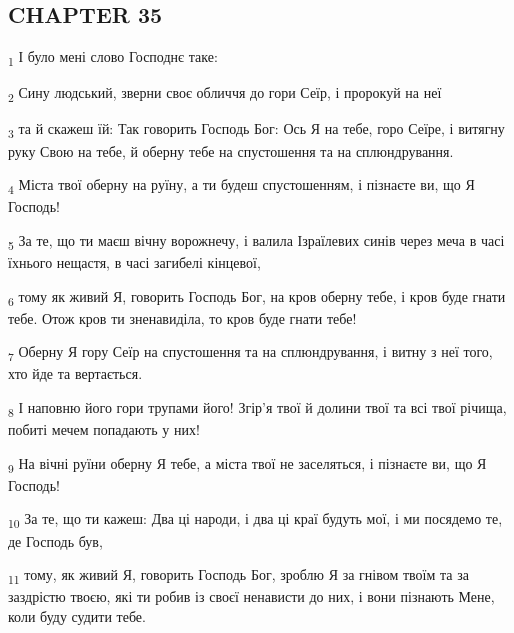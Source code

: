 \subsection{CHAPTER 35}
\begin{tcolorbox}
\textsubscript{1} І було мені слово Господнє таке:
\end{tcolorbox}
\begin{tcolorbox}
\textsubscript{2} Сину людський, зверни своє обличчя до гори Сеїр, і пророкуй на неї
\end{tcolorbox}
\begin{tcolorbox}
\textsubscript{3} та й скажеш їй: Так говорить Господь Бог: Ось Я на тебе, горо Сеїре, і витягну руку Свою на тебе, й оберну тебе на спустошення та на сплюндрування.
\end{tcolorbox}
\begin{tcolorbox}
\textsubscript{4} Міста твої оберну на руїну, а ти будеш спустошенням, і пізнаєте ви, що Я Господь!
\end{tcolorbox}
\begin{tcolorbox}
\textsubscript{5} За те, що ти маєш вічну ворожнечу, і валила Ізраїлевих синів через меча в часі їхнього нещастя, в часі загибелі кінцевої,
\end{tcolorbox}
\begin{tcolorbox}
\textsubscript{6} тому як живий Я, говорить Господь Бог, на кров оберну тебе, і кров буде гнати тебе. Отож кров ти зненавиділа, то кров буде гнати тебе!
\end{tcolorbox}
\begin{tcolorbox}
\textsubscript{7} Оберну Я гору Сеїр на спустошення та на сплюндрування, і витну з неї того, хто йде та вертається.
\end{tcolorbox}
\begin{tcolorbox}
\textsubscript{8} І наповню його гори трупами його! Згір'я твої й долини твої та всі твої річища, побиті мечем попадають у них!
\end{tcolorbox}
\begin{tcolorbox}
\textsubscript{9} На вічні руїни оберну Я тебе, а міста твої не заселяться, і пізнаєте ви, що Я Господь!
\end{tcolorbox}
\begin{tcolorbox}
\textsubscript{10} За те, що ти кажеш: Два ці народи, і два ці краї будуть мої, і ми посядемо те, де Господь був,
\end{tcolorbox}
\begin{tcolorbox}
\textsubscript{11} тому, як живий Я, говорить Господь Бог, зроблю Я за гнівом твоїм та за заздрістю твоєю, які ти робив із своєї ненависти до них, і вони пізнають Мене, коли буду судити тебе.
\end{tcolorbox}
